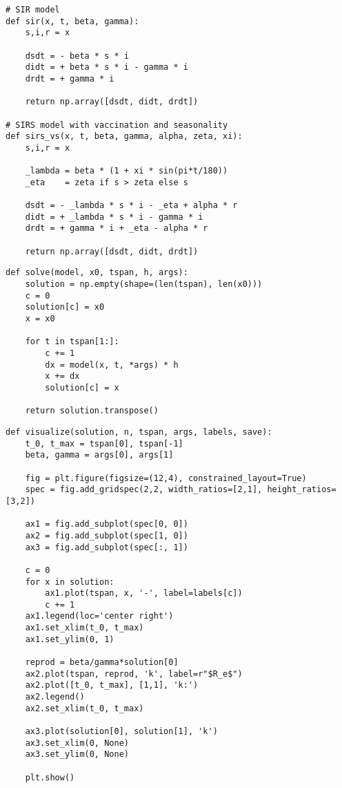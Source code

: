 \documentclass[../main.tex]{subfiles}
\begin{document}
\begin{lstlisting}[title=Definition der Differentialgleichungssysteme der verwendeten Modelle:]
# SIR model
def sir(x, t, beta, gamma):
    s,i,r = x

    dsdt = - beta * s * i
    didt = + beta * s * i - gamma * i
    drdt = + gamma * i

    return np.array([dsdt, didt, drdt])

# SIRS model with vaccination and seasonality
def sirs_vs(x, t, beta, gamma, alpha, zeta, xi):
    s,i,r = x

    _lambda = beta * (1 + xi * sin(pi*t/180))
    _eta    = zeta if s > zeta else s

    dsdt = - _lambda * s * i - _eta + alpha * r
    didt = + _lambda * s * i - gamma * i
    drdt = + gamma * i + _eta - alpha * r 

    return np.array([dsdt, didt, drdt])
\end{lstlisting}

\begin{lstlisting}[title=Lösung des Systems mit dem Euler-Verfahren:]
def solve(model, x0, tspan, h, args):
    solution = np.empty(shape=(len(tspan), len(x0)))
    c = 0
    solution[c] = x0
    x = x0
    
    for t in tspan[1:]:
        c += 1
        dx = model(x, t, *args) * h
        x += dx
        solution[c] = x

    return solution.transpose()
\end{lstlisting}

\begin{lstlisting}[title=Visualisierung:]
def visualize(solution, n, tspan, args, labels, save):
    t_0, t_max = tspan[0], tspan[-1]
    beta, gamma = args[0], args[1]

    fig = plt.figure(figsize=(12,4), constrained_layout=True)
    spec = fig.add_gridspec(2,2, width_ratios=[2,1], height_ratios=[3,2])

    ax1 = fig.add_subplot(spec[0, 0])
    ax2 = fig.add_subplot(spec[1, 0])
    ax3 = fig.add_subplot(spec[:, 1])

    c = 0
    for x in solution:
        ax1.plot(tspan, x, '-', label=labels[c])
        c += 1
    ax1.legend(loc='center right')
    ax1.set_xlim(t_0, t_max)
    ax1.set_ylim(0, 1)

    reprod = beta/gamma*solution[0]
    ax2.plot(tspan, reprod, 'k', label=r"$R_e$")
    ax2.plot([t_0, t_max], [1,1], 'k:')
    ax2.legend()
    ax2.set_xlim(t_0, t_max)

    ax3.plot(solution[0], solution[1], 'k')
    ax3.set_xlim(0, None)
    ax3.set_ylim(0, None)

    plt.show()
\end{lstlisting}
\end{document}
